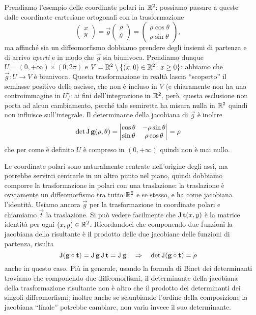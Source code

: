 Prendiamo l'esempio delle coordinate polari in $\mathbb{R}^2$: possiamo passare a queste dalle coordinate cartesiane ortogonali con la trasformazione
\begin{equation}
	\begin{pmatrix}
		x\\y
	\end{pmatrix}
	=\vec g
	\begin{pmatrix}
		\rho\\\theta
	\end{pmatrix}
	=
	\begin{pmatrix}
		\rho\cos\theta\\\rho\sin\theta
	\end{pmatrix},
\end{equation}
ma affinch\'e sia un diffeomorfismo dobbiamo prendere degli insiemi di partenza e di arrivo \emph{aperti} e in modo che $\vec g$ sia biunivoca.
Prendiamo dunque $U=(0,+\infty)\times(0,2\pi)$ e $V=\mathbb{R}^2\setminus\{(x,0)\in\mathbb{R}^2\colon x\geq 0\}$: abbiamo che $\vec g\colon U\to V$ è biunivoca.
Questa trasformazione in realtà lascia ``scoperto'' il semiasse positivo delle ascisse, che non è incluso in $V$ (e chiaramente non ha una controimmagine in $U$): ai fini dell'integrazione in $\mathbb{R}^2$, però, questa esclusione non porta ad alcun cambiamento, perch\'e tale semiretta ha misura nulla in $\mathbb{R}^2$ quindi non influisce sull'integrale.
Il determinante della jacobiana di $\vec g$ è inoltre
\begin{equation}
	\det\operatorname{J}\mathbf{g}(\rho,\theta)=
	\begin{vmatrix}
		\cos\theta &-\rho\sin\theta\\
		\sin\theta &\rho\cos\theta
	\end{vmatrix}
	=\rho
\end{equation}
che per come è definito $U$ è compreso in $(0,+\infty)$ quindi non è mai nullo.

Le coordinate polari sono naturalmente centrate nell'origine degli assi, ma potrebbe servirci centrarle in un altro punto nel piano, quindi dobbiamo comporre la trasformazione in polari con una traslazione: la traslazione è ovviamente un diffeomorfismo tra tutto $\mathbb{R}^2$ e se stesso, e ha come jacobiana l'identità.
Usiamo ancora $\vec g$ per la trasformazione in coordinate polari e chiamiamo $\vec t$ la traslazione.
Si può vedere facilmente che $\operatorname{J}\mathbf{t}(x,y)$ è la matrice identità per ogni $(x,y)\in\mathbb{R}^2$.
Ricordandoci che componendo due funzioni la jacobiana della risultante è il prodotto delle due jacobiane delle funzioni di partenza, risulta
\begin{equation}
	\operatorname{J}(\mathbf{g}\circ\mathbf{t})=\operatorname{J}\mathbf{g}\operatorname{J}\mathbf{t}=\operatorname{J}\mathbf{g}\quad\Rightarrow\quad\det\operatorname{J}(\mathbf{g}\circ\mathbf{t})=\rho
\end{equation}
anche in questo caso.
Più in generale, usando la formula di Binet dei determinanti troviamo che componendo due diffeomorfismi, il determinante della jacobiana della trasformazione risultante non è altro che il prodotto dei determinanti dei singoli diffeomorfismi; inoltre anche se scambiando l'ordine della composizione la jacobiana ``finale'' potrebbe cambiare, non varia invece il suo determinante.
